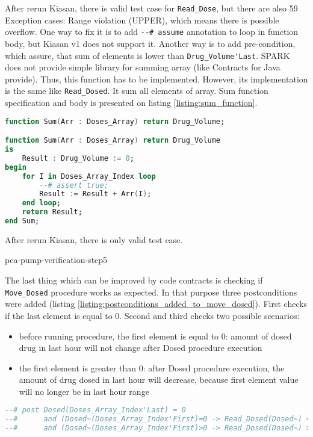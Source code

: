 After rerun Kiasan, there is valid test case for \lstinline{Read_Dose}, but there are also 59 Exception cases: Range violation (UPPER), which means there is possible overflow.
One way to fix it is to add \lstinline{--# assume} annotation to loop in function body, but Kiasan v1 does not support it. Another way is to add pre-condition, which assure, that sum of elements is lower than \lstinline{Drug_Volume'Last}. SPARK does not provide simple library for summing array (like Contracts for Java provide). Thus, this function has to be implemented. However, its implementation is the same like \lstinline{Read_Dosed}. It sum all elements of array. Sum function specification and body is presented on listing \ref{listing:sum_function}.

\begin{lstlisting}[language=ada, frame=single, gobble=0, caption={Sum function for summing all elements of array}, label={listing:sum_function}]
function Sum(Arr : Doses_Array) return Drug_Volume;

function Sum(Arr : Doses_Array) return Drug_Volume
is
    Result : Drug_Volume := 0;
begin
    for I in Doses_Array_Index loop
        --# assert true;
        Result := Result + Arr(I);
    end loop;
    return Result;
end Sum;

\end{lstlisting}


After rerun Kiasan, there is only valid test case.

pca-pump-verification-step5

The last thing which can be improved by code contracts is checking if \lstinline{Move_Dosed} procedure works as expected. In that purpose three postconditions were added (listing \ref{listing:postconditions_added_to_move_dosed}). First checks if the last element is equal to 0. Second and third checks two possible scenarios: 
\begin{itemize}
    \item before running procedure, the first element is equal to 0: amount of dosed drug in last hour will not change after Dosed procedure execution
    \item the first element is greater than 0: after Dosed procedure execution, the amount of drug dosed in last hour will decrease, because first element value will no longer be in last hour range
\end{itemize}

\begin{lstlisting}[language=ada, frame=single, gobble=0, caption={Postconditions added to Move\_Dosed procedure}, label={listing:postconditions_added_to_move_dosed}]
--# post Dosed(Doses_Array_Index'Last) = 0 
--#      and (Dosed~(Doses_Array_Index'First)=0 -> Read_Dosed(Dosed~) = Read_Dosed(Dosed))
--#      and (Dosed~(Doses_Array_Index'First)>0 -> Read_Dosed(Dosed~) > Read_Dosed(Dosed));
\end{lstlisting}


